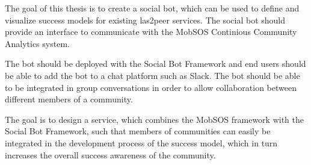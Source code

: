 The goal of this thesis is to create a social bot, which can be used to define and visualize success models for existing las2peer services. The social bot should provide an interface to communicate with the MobSOS Continious Community Analytics system.

The bot should be deployed with the Social Bot Framework and end users should be able to add the bot to a chat platform such as Slack. The bot should be able to be integrated in group conversations in order to allow collaboration between different members of a community.

The goal is to design a service, which combines the MobSOS framework with the Social Bot Framework, such that members of communities can easily be integrated in the development process of the success model, which in turn increases the overall success awareness of the community.

\blankpage
